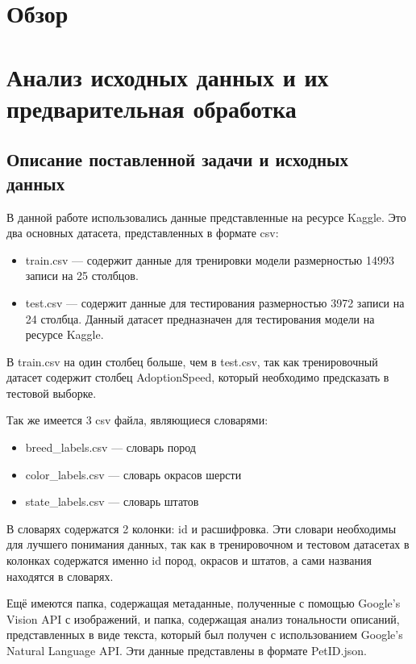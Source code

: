 \documentclass[14pt]{mmcs_article}
\begin{document}
\newpage
{}
\section*{Обзор}

\newpage
\section{Анализ исходных данных и их предварительная обработка}

\subsection{Описание поставленной задачи и исходных данных}

В данной работе использовались данные представленные на ресурсе Kaggle.  Это два основных датасета, представленных в формате csv:

\begin{itemize}
	\item train.csv --- содержит данные для тренировки модели размерностью 14993 записи на 25 столбцов.
	\item test.csv --- содержит данные для тестирования размерностью 3972 записи на 24 столбца. Данный датасет предназначен для тестирования модели на ресурсе Kaggle.
\end{itemize}

В train.csv на один столбец больше, чем в test.csv, так как тренировочный датасет содержит столбец AdoptionSpeed, который необходимо предсказать в тестовой выборке.

Так же имеется 3 csv файла, являющиеся словарями:

\begin{itemize}
	\item breed\_labels.csv --- словарь пород
	\item color\_labels.csv --- словарь окрасов шерсти
	\item state\_labels.csv --- словарь штатов
\end{itemize}

В словарях содержатся 2 колонки: id и расшифровка. Эти словари необходимы для лучшего понимания данных, так как в тренировочном и тестовом датасетах в колонках содержатся именно id пород, окрасов и штатов, а сами названия находятся в словарях.

Ещё имеются папка, содержащая метаданные, полученные с помощью Google’s Vision API с изображений, и папка, содержащая анализ тональности описаний, представленных в виде текста, который был получен с использованием Google’s Natural Language API. Эти данные представлены в формате PetID.json.
\end{document}
